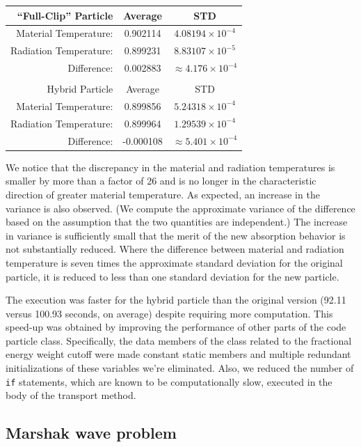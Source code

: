\documentclass[11pt]{nmemo}
\begin{document}
\begin{center}
  \begin{tabular}{r|cc}
    ``Full-Clip'' Particle  &  Average   & STD \\ \hline
     Material Temperature:  &  0.902114  & $4.08194\times 10^{-4}$ \\
     Radiation Temperature: &  0.899231  & $8.83107\times 10^{-5}$ \\
     Difference:            &  0.002883  & $\approx 4.176\times 10^{-4}$\\
     \multicolumn{3}{c}{} \\
     Hybrid Particle        &  Average   & STD \\ \hline
     Material Temperature:  &  0.899856  & $5.24318\times 10^{-4}$ \\
     Radiation Temperature: &  0.899964  & $1.29539\times 10^{-4}$ \\
     Difference:            & -0.000108  & $\approx 5.401\times 10^{-4}$\\
  \end{tabular}
\end{center}

We notice that the discrepancy in the material and radiation
temperatures is smaller by more than a factor of 26 and is no longer
in the characteristic direction of greater material temperature. As
expected, an increase in the variance is also observed. (We compute
the approximate variance of the difference based on the assumption
that the two quantities are independent.) The increase in variance is
sufficiently small that the merit of the new absorption behavior is
not substantially reduced. Where the difference between material and
radiation temperature is seven times the approximate standard
deviation for the original particle, it is reduced to less than one
standard deviation for the new particle.

The execution was faster for the hybrid particle than the original
version (92.11 versus 100.93 seconds, on average) despite requiring
more computation. This speed-up was obtained by improving the
performance of other parts of the code particle class. Specifically,
the data members of the class related to the fractional energy weight
cutoff were made constant static members and multiple redundant
initializations of these variables we're eliminated. Also, we reduced
the number of \texttt{if} statements, which are known to be
computationally slow, executed in the body of the transport method.

\subsection{Marshak wave problem}
\end{document}
